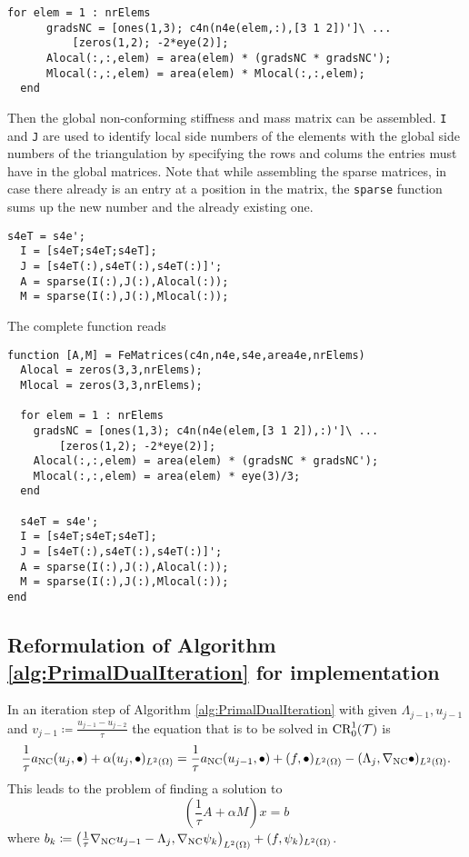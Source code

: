 \begin{lstlisting}[frame= single, numbers = none]
  for elem = 1 : nrElems
      gradsNC = [ones(1,3); c4n(n4e(elem,:),[3 1 2])']\ ...
          [zeros(1,2); -2*eye(2)]; 
      Alocal(:,:,elem) = area(elem) * (gradsNC * gradsNC'); 
      Mlocal(:,:,elem) = area(elem) * Mlocal(:,:,elem); 
  end
\end{lstlisting}
Then the global non-conforming stiffness and mass matrix can be assembled.
\texttt{I} and \texttt{J} are used to identify local side numbers of the elements
with the global side numbers of the triangulation by specifying the rows and colums
the entries must have in the global matrices. Note that while assembling the sparse matrices, 
in case there already is an entry at a position 
in the matrix, the \texttt{sparse} function sums up the new number and the already existing one.

\begin{lstlisting}[frame = single, numbers =none]
  s4eT = s4e';
  I = [s4eT;s4eT;s4eT];
  J = [s4eT(:),s4eT(:),s4eT(:)]';
  A = sparse(I(:),J(:),Alocal(:));
  M = sparse(I(:),J(:),Mlocal(:));
\end{lstlisting}

The complete function reads
\begin{lstlisting}[frame = single, numbers = none]
function [A,M] = FeMatrices(c4n,n4e,s4e,area4e,nrElems)
  Alocal = zeros(3,3,nrElems);
  Mlocal = zeros(3,3,nrElems);
  
  for elem = 1 : nrElems
    gradsNC = [ones(1,3); c4n(n4e(elem,[3 1 2]),:)']\ ...
        [zeros(1,2); -2*eye(2)]; 
    Alocal(:,:,elem) = area(elem) * (gradsNC * gradsNC'); 
    Mlocal(:,:,elem) = area(elem) * eye(3)/3; 
  end
  
  s4eT = s4e';
  I = [s4eT;s4eT;s4eT];
  J = [s4eT(:),s4eT(:),s4eT(:)]';
  A = sparse(I(:),J(:),Alocal(:));
  M = sparse(I(:),J(:),Mlocal(:));
end
\end{lstlisting}




\subsection{Reformulation of Algorithm \ref{alg:PrimalDualIteration} for implementation}

In an iteration step of Algorithm \ref{alg:PrimalDualIteration} with given
$\Lambda_{j-1}, u_{j-1}$ and $v_{j-1}\coloneqq\frac{u_{j-1}-u_{j-2}}{\tau}$ 
the equation that is to be solved in $\textup{CR}^1_0(\mathcal T)$ is
\begin{equation*} 
\frac{1}{\tau}a_{\textup{NC}}(u_j,\bullet)+\alpha(u_j,\bullet)_{L^2(\Omega)}
=
\frac{1}{\tau}a_{\textup{NC}}(u_{j-1},\bullet) + (f,\bullet)_{L^2(\Omega)}
- (\Lambda_j,\nabla_{\textup{NC}}\bullet)_{L^2(\Omega)}.
\end{equation*}
This leads to the problem of finding a solution to
\begin{equation}\label{equ:LinearSystem}
\left( \frac{1}{\tau}A+\alpha M\right) x=b  
\end{equation}
where
$b_k\coloneqq
\left(
\frac{1}{\tau}
\nabla_{\textup{NC}}u_{j-1}-\Lambda_j,\nabla_{\textup{NC}}\psi_k
\right)_{L^2(\Omega)}+(f,\psi_k)_{L^2(\Omega)}
$.


